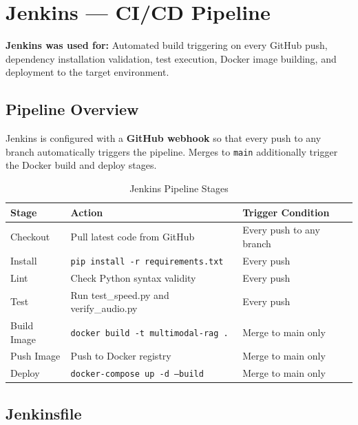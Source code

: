 \documentclass[12pt,a4paper]{report}
\begin{document}
\section{Jenkins --- CI/CD Pipeline}

\begin{mdframed}[style=toolbox]
\textbf{Jenkins was used for:} Automated build triggering on every GitHub push, dependency installation validation, test execution, Docker image building, and deployment to the target environment.
\end{mdframed}

\subsection{Pipeline Overview}

Jenkins is configured with a \textbf{GitHub webhook} so that every push to any branch automatically triggers the pipeline. Merges to \texttt{main} additionally trigger the Docker build and deploy stages.

\begin{table}[H]
\centering
\caption{Jenkins Pipeline Stages}
\begin{tabular}{p{2.5cm}p{5cm}p{5.5cm}}
\toprule
\textbf{Stage} & \textbf{Action} & \textbf{Trigger Condition} \\
\midrule
Checkout & Pull latest code from GitHub & Every push to any branch \\
Install & \texttt{pip install -r requirements.txt} & Every push \\
Lint & Check Python syntax validity & Every push \\
Test & Run test\_speed.py and verify\_audio.py & Every push \\
Build Image & \texttt{docker build -t multimodal-rag .} & Merge to main only \\
Push Image & Push to Docker registry & Merge to main only \\
Deploy & \texttt{docker-compose up -d --build} & Merge to main only \\
\bottomrule
\end{tabular}
\end{table}

\subsection{Jenkinsfile}
\end{document}
